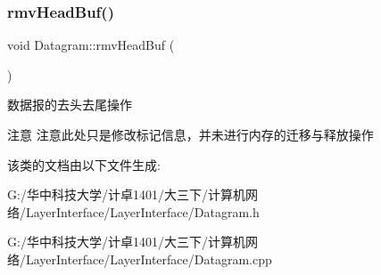 \subsubsection{\texorpdfstring{rmv\+Head\+Buf()}{rmvHeadBuf()}}
{\footnotesize\ttfamily void Datagram\+::rmv\+Head\+Buf (\begin{DoxyParamCaption}{ }\end{DoxyParamCaption})}



数据报的去头去尾操作 

\begin{DoxyAttention}{注意}
注意此处只是修改标记信息，并未进行内存的迁移与释放操作 
\end{DoxyAttention}


该类的文档由以下文件生成\+:\begin{DoxyCompactItemize}
\item 
G\+:/华中科技大学/计卓1401/大三下/计算机网络/\+Layer\+Interface/\+Layer\+Interface/Datagram.\+h\item 
G\+:/华中科技大学/计卓1401/大三下/计算机网络/\+Layer\+Interface/\+Layer\+Interface/Datagram.\+cpp\end{DoxyCompactItemize}
